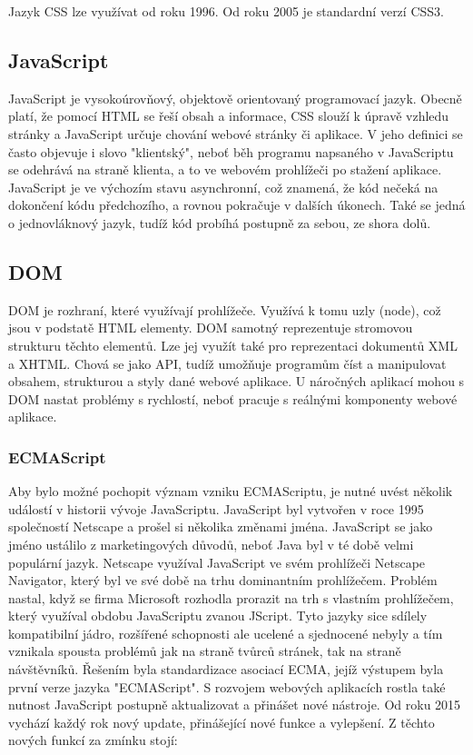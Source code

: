 Jazyk CSS lze využívat od roku 1996. Od roku 2005 je standardní verzí CSS3.\cite{Hauser}

\subsection{JavaScript}
JavaScript je vysokoúrovňový, objektově orientovaný programovací jazyk. Obecně platí, že pomocí HTML se řeší obsah a informace, CSS slouží k úpravě vzhledu stránky a  JavaScript určuje chování webové stránky či aplikace. V jeho definici se často objevuje i slovo "klientský", neboť běh programu napsaného v JavaScriptu se odehrává na straně klienta, a to ve webovém prohlížeči po stažení aplikace. JavaScript je ve výchozím stavu asynchronní, což znamená, že kód nečeká na dokončení kódu předchozího, a rovnou pokračuje v dalších úkonech. Také se jedná o jednovláknový jazyk, tudíž kód probíhá postupně za sebou, ze shora dolů.\cite{Dean}

\subsection{DOM}
DOM je rozhraní, které využívají prohlížeče. Využívá k tomu uzly (node), což jsou v podstatě HTML elementy. DOM samotný reprezentuje stromovou strukturu těchto elementů. Lze jej využít také pro reprezentaci dokumentů XML a XHTML. Chová se jako API, tudíž umožňuje programům číst a manipulovat obsahem, strukturou a styly dané webové aplikace. U náročných aplikací mohou s DOM nastat problémy s rychlostí, neboť pracuje s reálnými komponenty webové aplikace.


\subsubsection{ECMAScript}
 Aby bylo možné pochopit význam vzniku ECMAScriptu, je nutné uvést několik událostí v historii vývoje JavaScriptu. JavaScript byl vytvořen v roce 1995 společností Netscape a prošel si několika změnami jména. JavaScript se jako jméno ustálilo z marketingových důvodů, neboť Java byl v té době velmi populární jazyk. Netscape využíval JavaScript ve svém prohlížeči Netscape Navigator, který byl ve své době na trhu dominantním prohlížečem. Problém nastal, když se firma Microsoft rozhodla prorazit na trh s vlastním prohlížečem, který využíval obdobu JavaScriptu zvanou JScript. Tyto jazyky sice sdílely kompatibilní jádro, rozšířené schopnosti ale ucelené a sjednocené nebyly a tím vznikala spousta problémů jak na straně tvůrců stránek, tak na straně návštěvníků. Řešením byla standardizace asociací ECMA, jejíž výstupem byla první verze jazyka "ECMAScript". \cite{pravek} S rozvojem webových aplikacích rostla také nutnost JavaScript postupně aktualizovat a přinášet nové nástroje. Od roku 2015 vychází každý rok nový update, přinášející nové funkce a vylepšení. Z těchto nových funkcí za zmínku stojí:

